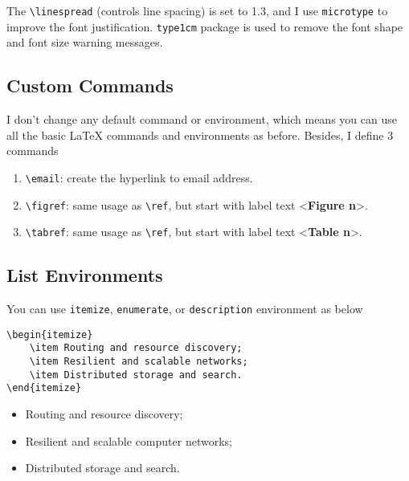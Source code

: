 \documentclass[en]{elegantpaper}
\begin{document}
The \lstinline{\linespread} (controls line spacing) is set to 1.3, and I use \lstinline{microtype} to improve the font justification. \lstinline{type1cm} package is used to remove the font shape and font size warning messages.

\subsection{Custom Commands}

I don't change any default command or environment, which means you can use all the basic \LaTeX{} commands and environments as before.  Besides, I define 3 commands
\begin{enumerate}
	\item \lstinline{\email}: create the hyperlink to email address.
	\item \lstinline{\figref}: same usage as \lstinline{\ref}, but start with label text <\textbf{Figure n}>.
	\item \lstinline{\tabref}: same usage as \lstinline{\ref}, but start with label text <\textbf{Table n}>.
\end{enumerate}{}

\subsection{List Environments}
You can use \lstinline{itemize}, \lstinline{enumerate}, or \lstinline{description} environment as below\\
\begin{minipage}[c]{0.50\linewidth}
\begin{lstlisting}
\begin{itemize}
    \item Routing and resource discovery;
    \item Resilient and scalable networks;
    \item Distributed storage and search.
\end{itemize}
\end{lstlisting}
\end{minipage}
\begin{minipage}[c]{0.48\linewidth}
\begin{itemize}
	\item Routing and resource discovery;
	\item Resilient and scalable computer networks;
	\item Distributed storage and search.
\end{itemize}
\end{minipage}
\end{document}
